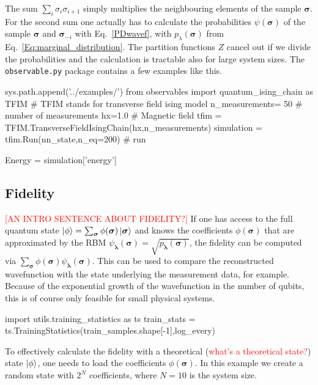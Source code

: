 \documentclass[submission, Phys]{SciPost}
\begin{document}
The sum $\sum_i \sigma_i \sigma_{i+1}$ simply multiplies the neighbouring elements of the sample $\bm{\sigma}$. For the second sum one actually has to calculate the probabilities $\psi (\bm{\sigma})$ of the sample $\bm{\sigma}$ and $\bm{\sigma}_{-i} $ with
Eq.~\ref{PDwavef},
with $p_{\lambda}(\bm{\sigma})$ from Eq.~\ref{Eq:marginal_distribution}. The partition functions $Z$ cancel out if we divide the probabilities and the calculation is tractable also for large system sizes.
The \verb|observable.py| package contains a few examples like this.

\begin{python}
	sys.path.append('../examples/')
	from observables import quantum_ising_chain as TFIM
	# TFIM stands for transverse field ising model
	n_measurements= 50 # number of measurements
	hx=1.0       # Magnetic field
	tfim = TFIM.TransverseFieldIsingChain(hx,n_measurements)
	simulation = tfim.Run(nn_state,n_eq=200) # run

	Energy = simulation['energy']
\end{python}

\subsection{Fidelity}
\textcolor{red}{[AN INTRO SENTENCE ABOUT FIDELITY?]}
If one has access to the full quantum state $\ket{\phi} = \sum_{\bm{\sigma}} \phi(\bm{\sigma}) \ket{ \bm{\sigma}}$
and knows the coefficients $\phi(\bm{\sigma})$ that are approximated by the RBM
$\psi_{\bm{\lambda}}(\bm{\sigma}) = \sqrt{p_{\bm{\lambda}}(\bm{\sigma})}$,
the fidelity can be computed via $\sum_{\bm{\sigma}} \phi(\bm{\sigma}) \psi_{\bm{\lambda}}(\bm{\sigma})$.
This can be used to compare the reconstructed wavefunction with the state underlying the measurement data, for example.
Because of the exponential growth of the wavefunction in the number of qubits, this is of course only feasible for small physical systems.
\begin{python}
	import utils.training_statistics as ts
	train_stats = ts.TrainingStatistics(train_samples.shape[-1],log_every)
\end{python}
%
To effectively calculate the fidelity with a theoretical (\textcolor{red}{what's a theoretical state?}) state $\ket{\phi}$, one needs to load the coefficients $\phi(\bm{\sigma})$. In this example we create a random state with $2^N$ coefficients, where $N=10$ is the system size.
\end{document}
